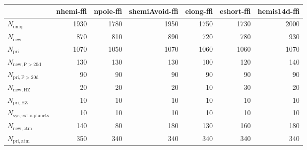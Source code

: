 \begin{tabular}{lrrrrrr}
\toprule
{} &  nhemi-ffi &  npole-ffi &  shemiAvoid-ffi &  elong-ffi &  eshort-ffi &  hemis14d-ffi \\
\midrule
$N_{\mathrm{uniq}}$               &       1930 &       1780 &            1950 &       1750 &        1730 &          2000 \\
$N_{\mathrm{new}}$                &        870 &        810 &             890 &        720 &         780 &           930 \\
$N_{\mathrm{pri}}$                &       1070 &       1050 &            1070 &       1060 &        1060 &          1070 \\
$N_{\mathrm{new,P>20d}}$          &        130 &        130 &             130 &        100 &         120 &           140 \\
$N_{\mathrm{pri,P>20d}}$          &         90 &         90 &              90 &         90 &          90 &            90 \\
$N_{\mathrm{new,HZ}}$             &         20 &         20 &              20 &         10 &          30 &            20 \\
$N_{\mathrm{pri,HZ}}$             &         10 &         10 &              10 &         10 &          10 &            10 \\
$N_{\mathrm{sys,extra\ planets}}$ &         10 &         10 &              10 &         10 &          10 &            10 \\
$N_{\mathrm{new,atm}}$            &        140 &         80 &             180 &        130 &         160 &           180 \\
$N_{\mathrm{pri,atm}}$            &        350 &        340 &             340 &        340 &         340 &           340 \\
\bottomrule
\end{tabular}
